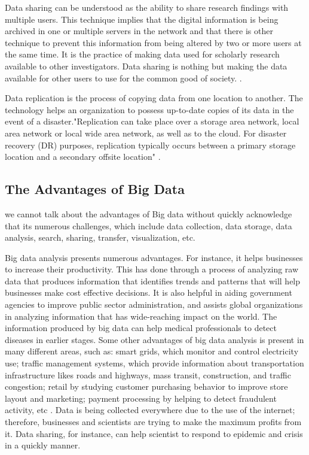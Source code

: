 \documentclass[sigconf]{acmart}
\begin{document}
Data sharing can be understood as the ability to share research findings with multiple users. This technique implies that the digital information is being archived in one or multiple servers in the network and that there is other technique to prevent this information from being altered by two or more users at the same time. It is the practice of making data used for scholarly research available to other investigators. Data sharing is nothing but making the data available for other users to use for the common good of society. \cite{Datasharing}. 

Data replication is the process of copying data from one location to another. The technology helps an organization to possess up-to-date copies of its data in the event of a disaster."Replication can take place over a storage area network, local area network or local wide area network, as well as to the cloud. For disaster recovery (DR) purposes, replication typically occurs between a primary storage location and a secondary offsite location" \cite{Datarep2017}.


\subsection{The Advantages of Big Data}


we cannot talk about the advantages of Big data without quickly acknowledge that its numerous challenges, which include data collection, data storage, data analysis, search, sharing, transfer, visualization, etc. 

Big data analysis presents numerous advantages. For instance, it helps businesses to increase their productivity. This has done through a process of analyzing raw data that produces information that identifies trends and patterns that will help businesses make cost effective decisions. It is also helpful in aiding government agencies to improve public sector administration, and assists global organizations in analyzing information that has wide-reaching impact on the world. The information produced by big data can help medical professionals to detect diseases in earlier stages. Some other advantages of big data analysis is present in many different areas, such as:  smart grids, which monitor and control electricity use; traffic management systems, which provide information about transportation infrastructure likes roads and highways, mass transit, construction, and traffic congestion; retail by studying customer purchasing behavior to improve store layout and marketing; payment processing by helping to detect fraudulent activity, etc \cite{tene2012big}. Data is being collected everywhere due to the use of the internet; therefore, businesses and scientists are trying to make the maximum profits from it. Data sharing, for instance, can help scientist to respond to epidemic and crisis in a quickly manner. 
\end{document}
